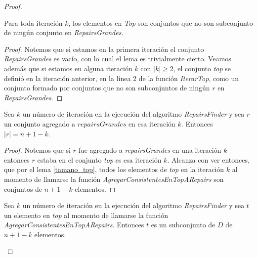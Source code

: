 \documentclass[11pt,a4paper,twoside]{tesis}
\begin{document}
\begin{proof}
\begin{lemma}\label{top_no_son_subconjunto_de_repairs_grandes}
Para toda iteración $k$, los elementos en \textit{Top} son conjuntos que no son subconjunto de ningún conjunto en \textit{RepairsGrandes}.
\end{lemma}

\begin{proof}
Notemos que si estamos en la primera iteración el conjunto \textit{RepairsGrandes} es vacío, con lo cual el lema es trivialmente cierto. Veamos además que si estamos en alguna iteración $k$ con $|k| \geq 2$, el conjunto \textit{top} se definió en la iteración anterior, en la línea 2 de la función \textit{IterarTop}, como un conjunto formado por conjuntos que no son subconjuntos de ningún $r$ en \textit{RepairsGrandes}. 
\end{proof}

\begin{lemma}\label{tamano_repairs_grandes}
Sea $k$ un número de iteración en la ejecución del algoritmo \textit{RepairsFinder} y sea $r$ un conjunto agregado a $repairsGrandes$ en esa iteración $k$. Entonces $|r| = n + 1 - k$.
\end{lemma}

\begin{proof}
Notemos que si $r$ fue agregado a \textit{repairsGrandes} en una iteración $k$ entonces $r$ estaba en el conjunto \textit{top} es esa iteración $k$. Alcanza con ver entonces, que por el lema \ref{tamano_top}, todos los elementos de \textit{top} en la iteración $k$ al momento de llamarse la función \textit{AgregarConsistentesEnTopARepairs} son conjuntos de $n + 1 - k$ elementos.
\end{proof}


\begin{lemma}\label{tamano_top}
Sea $k$ un número de iteración en la ejecución del algoritmo \textit{RepairsFinder} y sea $t$ un elemento en \textit{top} al momento de llamarse la función \textit{AgregarConsistentesEnTopARepairs}. Entonces $t$ es un subconjunto de $D$ de $n + 1 - k$ elementos. 
\end{lemma}


\end{proof}
\end{document}
